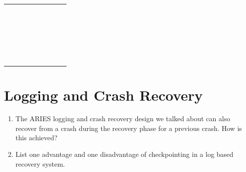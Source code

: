\documentclass{article}
\begin{document}
\begin{enumerate}
\begin{changemargin}{-0.5in}{0.5in}
\begin{tabular}{|c|c|c|c|c|c|c|c|}
\hline
  & & & & & & &\\
  & & & & & & &\\
  & & & & & & &\\
\hline
  & & & & & & &\\
  & & & & & & &\\
  & & & & & & &\\
\hline
  & & & & & & &\\
  & & & & & & &\\
  & & & & & & &\\
\hline
  & & & & & & &\\
  & & & & & & &\\
  & & & & & & &\\
\hline
  & & & & & & &\\
  & & & & & & &\\
  & & & & & & &\\
  \hline
  & & & & & & &\\
  & & & & & & &\\
  & & & & & & &\\
  \hline
  & & & & & & &\\
  & & & & & & &\\
  & & & & & & &\\
\hline
\end{tabular}
\end{changemargin}
\end{enumerate}

\section{Logging and Crash Recovery}
\begin{enumerate}
\item The ARIES logging and crash recovery design we talked about can also recover
from a crash during the recovery phase for a previous crash. How is this achieved?
\item List one advantage and one disadvantage of checkpointing in a log based recovery system.
\end{enumerate}

\end{document}
